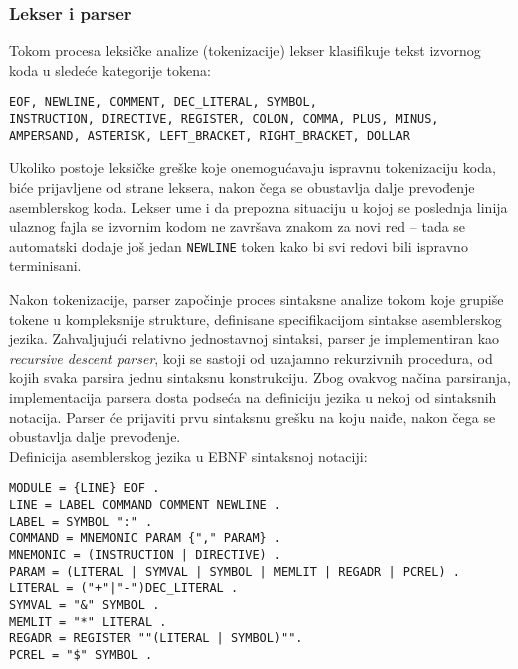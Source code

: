 \subsubsection{Lekser i parser}
Tokom procesa leksičke analize (tokenizacije) lekser klasifikuje tekst izvornog
koda u sledeće kategorije tokena:
\begin{flushleft}
\texttt{EOF, NEWLINE, COMMENT, DEC\_LITERAL, SYMBOL,\\
INSTRUCTION, DIRECTIVE, REGISTER, COLON, COMMA, PLUS, MINUS,\\
AMPERSAND, ASTERISK, LEFT\_BRACKET, RIGHT\_BRACKET, DOLLAR}
\end{flushleft}
Ukoliko postoje leksičke greške koje onemogućavaju ispravnu tokenizaciju koda,
biće prijavljene od strane leksera, nakon čega se obustavlja dalje prevo\-đenje
asemblerskog koda. Lekser ume i da prepozna situaciju u kojoj se poslednja linija
ulaznog fajla se izvornim kodom ne završava znakom za novi red -- tada se automatski
dodaje još jedan \texttt{NEWLINE} token kako bi svi redovi bili ispravno terminisani.

Nakon tokenizacije, parser započinje proces sinta\-ksne analize tokom koje grupiše
tokene u kompleksnije strukture, definisane speci\-fikacijom sintakse asemblerskog
jezika. Zahvaljujući relativno jednosta\-vnoj sintaksi, parser je implementiran kao
\textit{recursive descent parser}, koji se sastoji od uzaja\-mno rekurzivnih procedura,
od kojih svaka parsira jednu sintaksnu konstru\-kciju. Zbog ovakvog načina parsiranja,
implementacija par\-sera dosta podseća na definiciju jezika u nekoj od sintaksnih
notacija. Parser će prijaviti prvu sinta\-ksnu grešku na koju naiđe, nakon čega se
obustavlja dalje prevođe\-nje.\\

\noindent
Definicija asemblerskog jezika u EBNF sintaksnoj notaciji:
\begin{flushleft}
\texttt{MODULE = \{LINE\} EOF . \\
LINE = \lbrack LABEL\rbrack\ \lbrack COMMAND\rbrack\ \lbrack COMMENT\rbrack\
    NEWLINE . \\
LABEL = SYMBOL "{}:"{} . \\
COMMAND = MNEMONIC \lbrack PARAM \{"{},"{} PARAM\}\rbrack\ . \\
MNEMONIC = (INSTRUCTION | DIRECTIVE) . \\
PARAM = (LITERAL | SYMVAL | SYMBOL | MEMLIT | REGADR | PCREL) . \\
LITERAL = \lbrack ("{}+"{}|"{}-"{})\rbrack DEC\_LITERAL . \\
SYMVAL = "{}\&"{} SYMBOL . \\
MEMLIT = "{}*"{} LITERAL . \\
REGADR = REGISTER \lbrack "{}\lbrack"{}(LITERAL | SYMBOL)"{}\rbrack"{}\rbrack . \\
PCREL = "{}\$"{} SYMBOL . \\
}
\end{flushleft}
\newpage %

